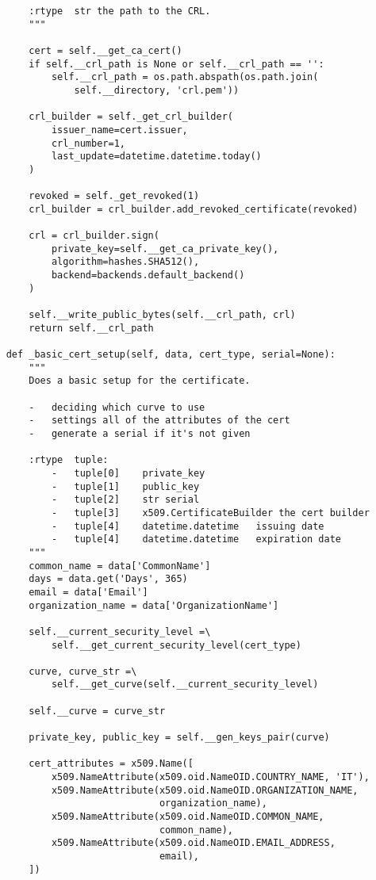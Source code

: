 \begin{verbatim}
        :rtype  str the path to the CRL.
        """

        cert = self.__get_ca_cert()
        if self.__crl_path is None or self.__crl_path == '':
            self.__crl_path = os.path.abspath(os.path.join(
                self.__directory, 'crl.pem'))

        crl_builder = self._get_crl_builder(
            issuer_name=cert.issuer,
            crl_number=1,
            last_update=datetime.datetime.today()
        )

        revoked = self._get_revoked(1)
        crl_builder = crl_builder.add_revoked_certificate(revoked)

        crl = crl_builder.sign(
            private_key=self.__get_ca_private_key(),
            algorithm=hashes.SHA512(),
            backend=backends.default_backend()
        )

        self.__write_public_bytes(self.__crl_path, crl)
        return self.__crl_path

    def _basic_cert_setup(self, data, cert_type, serial=None):
        """
        Does a basic setup for the certificate.

        -   deciding which curve to use
        -   settings all of the attributes of the cert
        -   generate a serial if it's not given

        :rtype  tuple:
            -   tuple[0]    private_key
            -   tuple[1]    public_key
            -   tuple[2]    str serial
            -   tuple[3]    x509.CertificateBuilder the cert builder
            -   tuple[4]    datetime.datetime   issuing date
            -   tuple[4]    datetime.datetime   expiration date
        """
        common_name = data['CommonName']
        days = data.get('Days', 365)
        email = data['Email']
        organization_name = data['OrganizationName']

        self.__current_security_level =\
            self.__get_current_security_level(cert_type)

        curve, curve_str =\
            self.__get_curve(self.__current_security_level)

        self.__curve = curve_str

        private_key, public_key = self.__gen_keys_pair(curve)

        cert_attributes = x509.Name([
            x509.NameAttribute(x509.oid.NameOID.COUNTRY_NAME, 'IT'),
            x509.NameAttribute(x509.oid.NameOID.ORGANIZATION_NAME,
                               organization_name),
            x509.NameAttribute(x509.oid.NameOID.COMMON_NAME,
                               common_name),
            x509.NameAttribute(x509.oid.NameOID.EMAIL_ADDRESS,
                               email),
        ])


\end{verbatim}
